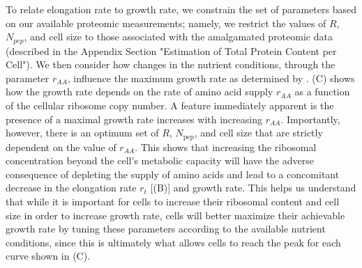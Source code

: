 \begin{figure}
\end{figure}


To relate elongation rate to growth rate, we constrain the set of parameters
based on our available proteomic measurements; namely, we restrict the values of
$R$, $N_{pep}$, and cell size to those associated with the amalgamated proteomic
data (described in the Appendix Section "Estimation of Total Protein Content per
Cell"). We then consider how changes in the nutrient conditions, through the
parameter $r_{AA}$, influence the maximum growth rate as determined by
. (C) shows how the growth rate
depends on the rate of amino acid supply $r_{AA}$ as a function of the cellular
ribosome copy number. A feature immediately apparent is the presence of a
maximal growth rate increases with increasing $r_{AA}$. Importantly, however,
there is an optimum set of $R$, $N_\text{pep}$, and cell size that are strictly
dependent on the value of $r_{AA}$. This shows that increasing the ribosomal
concentration beyond the cell's metabolic capacity will have the adverse
consequence of depleting the supply of amino acids and lead to a concomitant
decrease in the elongation rate $r_t$ [(B)] and
growth rate. This helps us understand that while it is important for cells to
increase their ribosomal content and cell size in order to increase growth rate,
cells will better maximize their achievable growth rate by tuning these
parameters according to the available nutrient conditions, since this is
ultimately what allows cells to reach the peak for each curve shown in
(C).


